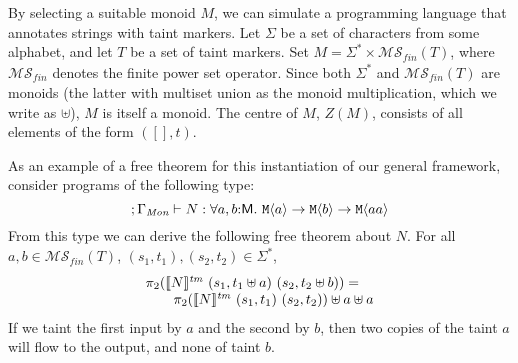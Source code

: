 \begin{example}
  By selecting a suitable monoid $M$, we can simulate a programming
  language that annotates strings with taint markers. Let $\Sigma$ be
  a set of characters from some alphabet, and let $T$ be a set of
  taint markers. Set $M = \Sigma^* \times
  \mathcal{MS}_{\mathit{fin}}(T)$, where $\mathcal{MS}_{\mathit{fin}}$
  denotes the finite power set operator. Since both $\Sigma^*$ and
  $\mathcal{MS}_{\mathit{fin}}(T)$ are monoids (the latter with
  multiset union as the monoid multiplication, which we write as
  $\uplus$), $M$ is itself a monoid. The centre of $M$, $Z(M)$,
  consists of all elements of the form $([], t)$.

  As an example of a free theorem for this instantiation of our
  general framework, consider programs of the following type:
  \begin{displaymath}
    ; \Gamma_{\textit{Mon}} \vdash N : \forall a,b\mathord:\mathsf{M}.\ \textup{\texttt{M}}\langle a \rangle \to \textup{\texttt{M}}\langle b \rangle \to \textup{\texttt{M}}\langle aa \rangle
  \end{displaymath}
  From this type we can derive the following free theorem about
  $N$. For all $a, b \in \mathcal{MS}_{\mathit{fin}}(T)$, $(s_1,t_1),
  (s_2,t_2) \in \Sigma^*$,
  \begin{displaymath}
    \begin{array}{l}
      \pi_2(\llbracket N \rrbracket^{\mathit{tm}}\ (s_1,t_1 \uplus a)\ (s_2,t_2 \uplus b)) = \\
      \hspace{2em}\pi_2(\llbracket N \rrbracket^{\mathit{tm}}\ (s_1,t_1)\ (s_2,t_2)) \uplus a \uplus a
    \end{array}
  \end{displaymath}
  If we taint the first input by $a$ and the second by $b$, then two
  copies of the taint $a$ will flow to the output, and none of taint
  $b$.
\end{example}






